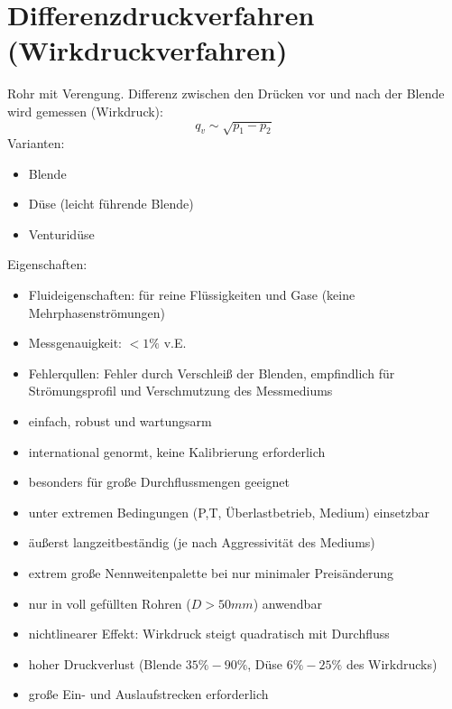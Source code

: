 \documentclass{scrreprt}
\begin{document}
\section{Differenzdruckverfahren (Wirkdruckverfahren)}
Rohr mit Verengung. Differenz zwischen den Drücken vor und nach der Blende wird gemessen (Wirkdruck):
$$q_v\sim \sqrt{p_1-p_2}$$
Varianten:
\begin{itemize}
\item Blende
\item Düse (leicht führende Blende)
\item Venturidüse
\end{itemize}
Eigenschaften:
\begin{itemize}
\item Fluideigenschaften: für reine Flüssigkeiten und Gase (keine Mehrphasenströmungen)
\item Messgenauigkeit: $<1\%$ v.E.
\item Fehlerqullen: Fehler durch Verschleiß der Blenden, empfindlich für Strömungsprofil und Verschmutzung des Messmediums
\end{itemize}
\begin{itemize}[label=$+$]
\item einfach, robust und wartungsarm
\item international genormt, keine Kalibrierung erforderlich
\item besonders für große Durchflussmengen geeignet
\item unter extremen Bedingungen (P,T, Überlastbetrieb, Medium) einsetzbar
\item äußerst langzeitbeständig (je nach Aggressivität des Mediums)
\item extrem große Nennweitenpalette bei nur minimaler Preisänderung
\end{itemize}
\begin{itemize}[label=$-$]
\item nur in voll gefüllten Rohren ($D > 50\unit{mm}$) anwendbar
\item nichtlinearer Effekt: Wirkdruck steigt quadratisch mit Durchfluss
\item hoher Druckverlust (Blende $35\%-90\%$, Düse $6\%-25\%$ des Wirkdrucks)
\item große Ein- und Auslaufstrecken erforderlich
\end{itemize}
\end{document}
